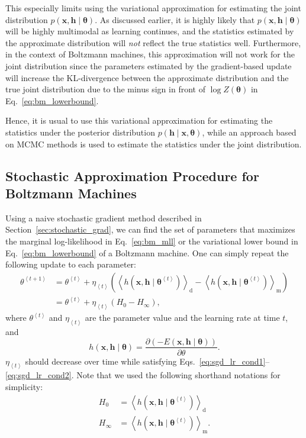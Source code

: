 \documentclass{now}
\newcommand{\qt}[1]{\left<#1\right>}
\newcommand{\vect}[1]{\mathbf{#1}}
\newcommand{\vects}[1]{\boldsymbol{#1}}
\newcommand{\vh}[0]{\vect{h}}
\newcommand{\vx}[0]{\vect{x}}
\newcommand{\td}[0]{\text{d}}
\newcommand{\tf}[0]{\text{m}}
\newcommand{\TT}[0]{{\vects{\theta}}}
\begin{document}
This especially limits using the variational approximation for estimating the
joint distribution ${p(\vx, \vh \mid \TT)}$. As discussed earlier, it is highly
likely that ${p(\vx, \vh \mid \TT)}$ will be highly multimodal as learning
continues, and the statistics estimated by the approximate distribution will
\textit{not} reflect the true statistics well. Furthermore, in the context of
Boltzmann machines, this approximation will not work for the joint distribution
since the parameters estimated by the gradient-based update will increase the
KL-divergence between the approximate distribution and the true joint
distribution due to the minus sign in front of $\log Z(\TT)$ in
Eq.~\eqref{eq:bm_lowerbound}.

Hence, it is usual to use this variational approximation for estimating the
statistics under the posterior distribution ${p(\vh \mid \vx, \TT)}$, while an
approach based on MCMC methods is used to estimate the statistics under the
joint distribution. 

\subsection{Stochastic Approximation Procedure for Boltzmann Machines}
\label{sec:sap}

Using a naive stochastic gradient method described in
Section~\ref{sec:stochastic_grad}, we can find the set of parameters that
maximizes the marginal log-likelihood in Eq.~\eqref{eq:bm_mll} or the
variational lower bound in Eq.~\eqref{eq:bm_lowerbound} of a Boltzmann machine.
One can simply repeat the following update to each parameter:
\begin{align}
    \theta^{\qt{t+1}} &= \theta^{\qt{t}} + \eta_{\qt{t}} \left( 
    \left< h(\vx, \vh\mid \TT^{\qt{t}})
    \right>_\td 
    -
    \left< h(\vx, \vh\mid \TT^{\qt{t}})
    \right>_\tf \right) 
    \nonumber
    \\
    \label{eq:sap_grad}
    &= \theta^{\qt{t}} + \eta_{\qt{t}} \left( H_0 - H_\infty \right),
\end{align}
where $\theta^{\qt{t}}$ and $\eta_{\qt{t}}$ are the parameter value and the
learning rate at time $t$, and
\[
h(\vx, \vh \mid \TT) = \frac{\partial
    \left(-E(\vx, \vh\mid\TT)\right)}{\partial \theta}.
\]
$\eta_{\qt{t}}$ should decrease over time while satisfying
Eqs.~\eqref{eq:sgd_lr_cond1}--\eqref{eq:sgd_lr_cond2}. Note that we used the
following shorthand notations for simplicity:
\begin{align*}
    H_0 &= \left< h(\vx, \vh\mid \TT^{\qt{t}})
    \right>_\td \\
    H_\infty &= \left< h(\vx, \vh\mid \TT^{\qt{t}})
    \right>_\tf.
\end{align*}
\end{document}
